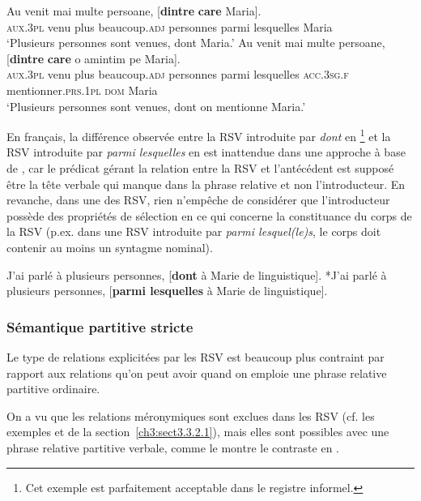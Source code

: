 \ea \label{ch3:ex108}
\ea 
\gll *Au  venit  mai  multe  persoane,  [\textbf{dintre} \textbf{care}  Maria]. \label{ch3:ex108a}\\
\textsc{aux.3pl}  venu  plus  beaucoup.\textsc{adj}  personnes  parmi  lesquelles  Maria \\
\glt ‘Plusieurs personnes sont venues, dont Maria.’
\ex 
\gll Au  venit  mai  multe  persoane,  [\textbf{dintre} \textbf{care}  o amintim  pe  Maria]. \label{ch3:ex108b}\\
\textsc{aux.3pl}  venu  plus  beaucoup.\textsc{adj}  personnes  parmi  lesquelles  \textsc{acc.3sg.f} 
mentionner.\textsc{prs.1pl} \textsc{dom}  Maria \\
\glt ‘Plusieurs personnes sont venues, dont on mentionne Maria.’
\z 
\z 

En français, la différence observée entre la RSV introduite par \textit{dont} en \footnote{Cet exemple est parfaitement acceptable dans le registre informel.} et la RSV introduite par \textit{parmi lesquelles} en  est inattendue dans une approche à base de , car le prédicat gérant la relation entre la RSV et l’antécédent est supposé être la tête verbale qui manque dans la phrase relative et non l’introducteur. En revanche, dans une  des RSV, rien n’empêche de considérer que l’introducteur possède des propriétés de sélection en ce qui concerne la constituance du corps de la RSV (p.ex. dans une RSV introduite par \textit{parmi lesquel(le)s}, le corps doit contenir au moins un syntagme nominal). 

\ea \label{ch3:ex109}
\ea 
J’ai parlé à plusieurs personnes, [\textbf{dont} à Marie de linguistique]. \label{ch3:ex109a} 
\ex
*J’ai parlé à plusieurs personnes, [\textbf{parmi lesquelles} à Marie de linguistique]. \label{ch3:ex109b}
\z 
\z


\subsubsection{Sémantique partitive stricte}\label{ch3:sect3.4.2.3}

Le type de relations explicitées par les RSV est beaucoup plus contraint par rapport aux relations qu’on peut avoir quand on emploie une phrase relative partitive ordinaire. 

On a vu que les relations méronymiques sont exclues dans les RSV (cf. les exemples  et  de la section~\ref{ch3:sect3.3.2.1}), mais elles sont possibles avec une phrase relative partitive verbale, comme le montre le contraste en .

